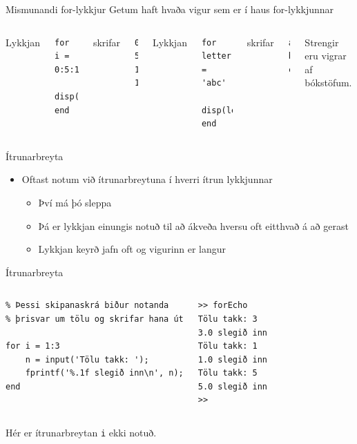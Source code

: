 \documentclass{beamer}
\begin{document}
\begin{frame}[fragile]{Mismunandi for-lykkjur}
Getum haft hvaða vigur sem er í haus for-lykkjunnar
\begin{columns}
Lykkjan
\begin{verbatim}
for i = 0:5:15
    disp(i)
end
\end{verbatim}
skrifar
\begin{verbatim}
0
5
10
15
\end{verbatim}


Lykkjan 
\begin{verbatim}
for letter = 'abc'
    disp(letter)
end
\end{verbatim}
skrifar
\begin{verbatim}
a
b
c
\end{verbatim}
Strengir eru vigrar af bókstöfum.
\end{columns}
\end{frame}

\begin{frame}[fragile]{Ítrunarbreyta}
\begin{itemize}
 \item Oftast notum við ítrunarbreytuna í hverri ítrun lykkjunnar
 \begin{itemize}
  \item Því má þó sleppa
  \item Þá er lykkjan einungis notuð til að ákveða hversu oft eitthvað á að gerast
  \item Lykkjan keyrð jafn oft og vigurinn er langur
 \end{itemize}
\end{itemize}
\end{frame}

\begin{frame}[fragile]{Ítrunarbreyta}
\begin{columns}
\begin{verbatim}
% Þessi skipanaskrá biður notanda 
% þrisvar um tölu og skrifar hana út

for i = 1:3
    n = input('Tölu takk: ');
    fprintf('%.1f slegið inn\n', n);
end
\end{verbatim}
\begin{verbatim}
>> forEcho
Tölu takk: 3
3.0 slegið inn
Tölu takk: 1
1.0 slegið inn
Tölu takk: 5
5.0 slegið inn
>>
\end{verbatim}
\end{columns}
\vspace{\baselineskip}
Hér er ítrunarbreytan \texttt{i} ekki notuð.
\end{frame}
\end{document}
